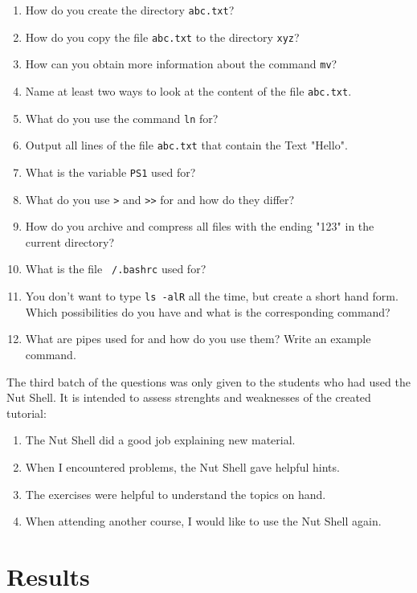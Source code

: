 \documentclass[paper=a4,twoside,abstract=on,cleardoublepage=empty,numbers=noenddot,toc=bib,12pt,appendixprefix=true]{scrreprt}
\begin{document}
\begin{enumerate}
    \item How do you create the directory \texttt{abc.txt}?
    \item How do you copy the file \texttt{abc.txt} to the directory \texttt{xyz}?
    \item How can you obtain more information about the command \texttt{mv}?
    \item Name at least two ways to look at the content of the file \texttt{abc.txt}.
    \item What do you use the command \texttt{ln} for?
    \item Output all lines of the file \texttt{abc.txt} that contain the Text "Hello".
    \item What is the variable \texttt{PS1} used for?
    \item What do you use \texttt{>} and \texttt{>>} for and how do they differ?
    \item How do you archive and compress all files with the ending "123" in the current directory?
    \item What is the file \texttt{~/.bashrc} used for?
    \item You don't want to type \texttt{ls -alR} all the time, but create a short hand form. Which possibilities do you have and what is the corresponding command?
    \item What are pipes used for and how do you use them? Write an example command.
\end{enumerate}

The third batch of the questions was only given to the students who had used the Nut Shell. It is intended to assess strenghts and weaknesses of the created tutorial:

\begin{enumerate}
    \item The Nut Shell did a good job explaining new material.
    \item When I encountered problems, the Nut Shell gave helpful hints.
    \item The exercises were helpful to understand the topics on hand.
    \item When attending another course, I would like to use the Nut Shell again.
\end{enumerate}

\section{Results}
\end{document}
